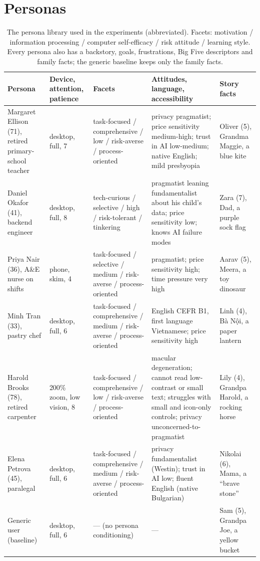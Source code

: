 \documentclass[10pt,twocolumn]{article}
\begin{document}



\appendix
\onecolumn

\section{Personas}
\label{app:personas}

\begin{table}[h]
\centering
\footnotesize
\caption{The persona library used in the experiments (abbreviated). Facets: motivation / information processing / computer self-efficacy / risk attitude / learning style. Every persona also has a backstory, goals, frustrations, Big Five descriptors and family facts; the generic baseline keeps only the family facts.}
\label{tab:personas}
\begin{tabularx}{\textwidth}{@{}P{3.1cm}P{1.9cm}YYP{2.2cm}@{}}
\toprule
Persona & Device, attention, patience & Facets & Attitudes, language, accessibility & Story facts \\
\midrule
Margaret Ellison (71), retired primary-school teacher & desktop, full, 7 & task-focused / comprehensive / low / risk-averse / process-oriented & privacy pragmatist; price sensitivity medium-high; trust in AI low-medium; native English; mild presbyopia & Oliver (5), Grandma Maggie, a blue kite \\
\addlinespace[3pt]
Daniel Okafor (41), backend engineer & desktop, full, 8 & tech-curious / selective / high / risk-tolerant / tinkering & pragmatist leaning fundamentalist about his child's data; price sensitivity low; knows AI failure modes & Zara (7), Dad, a purple sock flag \\
\addlinespace[3pt]
Priya Nair (36), A\&E nurse on shifts & phone, skim, 4 & task-focused / selective / medium / risk-averse / process-oriented & pragmatist; price sensitivity high; time pressure very high & Aarav (5), Meera, a toy dinosaur \\
\addlinespace[3pt]
Minh Tran (33), pastry chef & desktop, full, 6 & task-focused / comprehensive / medium / risk-averse / process-oriented & English CEFR B1, first language Vietnamese; price sensitivity high & Linh (4), Bà Nội, a paper lantern \\
\addlinespace[3pt]
Harold Brooks (78), retired carpenter & 200\% zoom, low vision, 8 & task-focused / comprehensive / low / risk-averse / process-oriented & macular degeneration; cannot read low-contrast or small text; struggles with small and icon-only controls; privacy unconcerned-to-pragmatist & Lily (4), Grandpa Harold, a rocking horse \\
\addlinespace[3pt]
Elena Petrova (45), paralegal & desktop, full, 6 & task-focused / comprehensive / medium / risk-averse / process-oriented & privacy fundamentalist (Westin); trust in AI low; fluent English (native Bulgarian) & Nikolai (6), Mama, a ``brave stone'' \\
\addlinespace[3pt]
Generic user (baseline) & desktop, full, 6 & --- (no persona conditioning) & --- & Sam (5), Grandpa Joe, a yellow bucket \\
\bottomrule
\end{tabularx}
\end{table}
\end{document}
